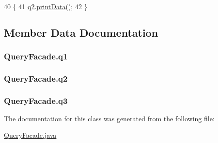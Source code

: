 \begin{DoxyCode}
40                                    \{
41         \hyperlink{classQueryFacade_a4ee742366b301a5101dc0093bab15c4f}{q2}.\hyperlink{classQuery2_ae1f51e2c333e090fcd07a573a2ba7b10}{printData}();
42     \}
\end{DoxyCode}


\subsection{Member Data Documentation}
\subsubsection[{\texorpdfstring{q1}{q1}}]{ Query\+Facade.\+q1\hspace{0.3cm}{\ttfamily [private]}}\hypertarget{classQueryFacade_ac16b7d9bc39fc5e88232a7a271c0ea9c}{}\label{classQueryFacade_ac16b7d9bc39fc5e88232a7a271c0ea9c}
\subsubsection[{\texorpdfstring{q2}{q2}}]{ Query\+Facade.\+q2\hspace{0.3cm}{\ttfamily [private]}}\hypertarget{classQueryFacade_a4ee742366b301a5101dc0093bab15c4f}{}\label{classQueryFacade_a4ee742366b301a5101dc0093bab15c4f}
\subsubsection[{\texorpdfstring{q3}{q3}}]{ Query\+Facade.\+q3\hspace{0.3cm}{\ttfamily [private]}}\hypertarget{classQueryFacade_ac287507d9f5380c11f9cc26856e6a6b3}{}\label{classQueryFacade_ac287507d9f5380c11f9cc26856e6a6b3}


The documentation for this class was generated from the following file\+:\begin{DoxyCompactItemize}
\item 
\hyperlink{QueryFacade_8java}{Query\+Facade.\+java}\end{DoxyCompactItemize}
